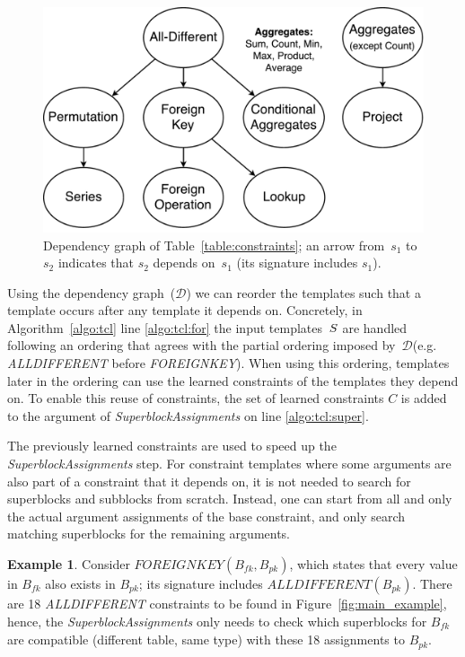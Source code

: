 \documentclass{IEEEtran}
\newcommand{\format}[1]{\textit{#1}\xspace}
\newcommand{\generategroups}{\format{SuperblockAssignments}}
\newcommand{\dependencies}{\ensuremath{\mathcal{D}}\xspace}
\newcommand{\ecfkey}[2]{\ensuremath{\textit{FOREIGNKEY}(#1,#2)}}
\newcommand{\ecalldiff}[1]{\ensuremath{\textit{ALLDIFFERENT}(#1)}}
\newcommand{\sbs}{B}
\newcommand{\sbl}[1]{\ensuremath{\sbs_{\textit{#1}}}}
\theoremstyle{definition}
\newtheorem{example}{Example}
\begin{document}
\begin{figure}[t]
  \centering
  \includegraphics[width=0.65\linewidth]{figures/constraint_dependency2.pdf}
  \caption{Dependency graph of Table~\ref{table:constraints}; an arrow from~$s_1$ to~$s_2$ indicates that $s_2$ depends on~$s_1$ (its signature includes $s_1$).
  }
  \label{fig:learning_order}
\end{figure}

Using the dependency graph~(\dependencies) we can reorder the templates such that a template occurs after any template it depends on.
Concretely, in Algorithm~\ref{algo:tcl} line \ref{algo:tcl:for} the input templates~$S$ are handled following an ordering that agrees with the partial ordering imposed by~\dependencies (e.g. \textit{ALLDIFFERENT} before \textit{FOREIGNKEY}).
When using this ordering, templates later in the ordering can use the learned constraints of the templates they depend on.
To enable this reuse of constraints, the set of learned constraints $C$ is added to the argument of \generategroups on line \ref{algo:tcl:super}.

The previously learned constraints are used to speed up the \generategroups step. For constraint templates where some arguments are also part of a constraint that it depends on, it is not needed to search for superblocks and subblocks from scratch. Instead, one can start from all and only the actual argument assignments of the base constraint, and only search matching superblocks for the remaining arguments.

\begin{example}
  Consider $\ecfkey{\sbl{fk}}{\sbl{pk}}$, which states that every value in $\sbl{fk}$ also exists in $\sbl{pk}$; its signature includes $\ecalldiff{\sbl{pk}}$. There are 18 \textit{ALLDIFFERENT} constraints to be found in Figure~\ref{fig:main_example}, hence, the \generategroups only needs to check which superblocks for $\sbl{fk}$ are compatible (different table, same type) with these 18 assignments to $\sbl{pk}$.
\end{example}
\end{document}
